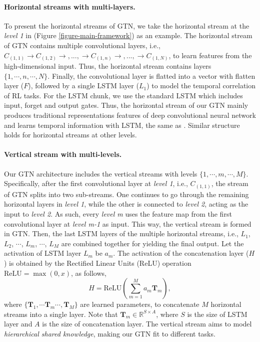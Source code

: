 \documentclass[letterpaper]{article} %
\begin{document}
\paragraph{Horizontal streams with multi-layers.}
To present the horizontal streams of GTN, we take the horizontal stream at the \textit{level 1} in (Figure \ref{figure-main-framework}) as an example.
The horizontal stream of GTN contains multiple convolutional layers, i.e., $C_{(1,1)}\rightarrow C_{(1,2)}\rightarrow,...,\rightarrow C_{(1,n)} \rightarrow,...,\rightarrow C_{(1,N)}$, to learn features from the high-dimensional input. Thus, the horizontal stream contains layers $\{1, \cdots, n, \cdots, N\}$.
Finally, the convolutional layer is flatted into a vector with flatten layer ($F$), followed by a single LSTM layer ($L_1$) to model the temporal correlation of RL tasks.
For the LSTM chunk, we use the standard LSTM \cite{hochreiter1997long} which includes input, forget and output gates.
Thus, the horizontal stream of our GTN mainly produces traditional representations features of deep convolutional neural network \cite{simonyan2014very} and learns temporal information with LSTM, the same as \cite{hausknecht2015deep}. Similar structure holds for horizontal streams at other levels.

\paragraph{Vertical stream with multi-levels.}
Our GTN architecture includes the vertical streams with levels $\{1, \cdots, m, \cdots, M\}$.
Specifically, after the first convolutional layer at \textit{level 1}, i.e., $C_{(1,1)}$, the stream of GTN splits into two sub-streams.
One continues to go through the remaining horizontal layers in \textit{level 1}, while the other is connected to \textit{level 2}, acting as the input to \textit{level 2}.
As such, every \textit{level  m} uses the feature map from the first convolutional layer at \textit{level m-1} as input.
This way, the vertical stream is formed in GTN.
Then, the last LSTM layers of the multiple horizontal streams, i.e.,  $L_1$, $L_2$, $\cdots$, $L_m$, $\cdots$, $L_M$ are combined together for yielding the final output.
Let the activation of LSTM layer $L_m$ be $a_m$.
The activation of the concatenation layer ($H$) is obtained by the Rectified Linear Units (\textrm{ReLU}) operation $\textrm{ReLU}=\max(0,x)$, as follows,
\begin{equation}
\label{combine}
H=\textrm{ReLU}(\sum^{M}_{m=1}a_{m}\textbf{T}_{m}),
\end{equation}
where $\{ \textbf{T}_1, \cdots \textbf{T}_m \cdots, \textbf{T}_M\}$ are learned parameters, to concatenate $M$ horizontal streams into a single layer.
Note that $\textbf{T}_{m}\in\mathbb{R}^{S \times A}$, where $S$ is the size of LSTM layer and $A$ is the size of concatenation layer.
The vertical stream aims to model \textit{hierarchical shared knowledge}, making our GTN fit to different tasks.
\end{document}
